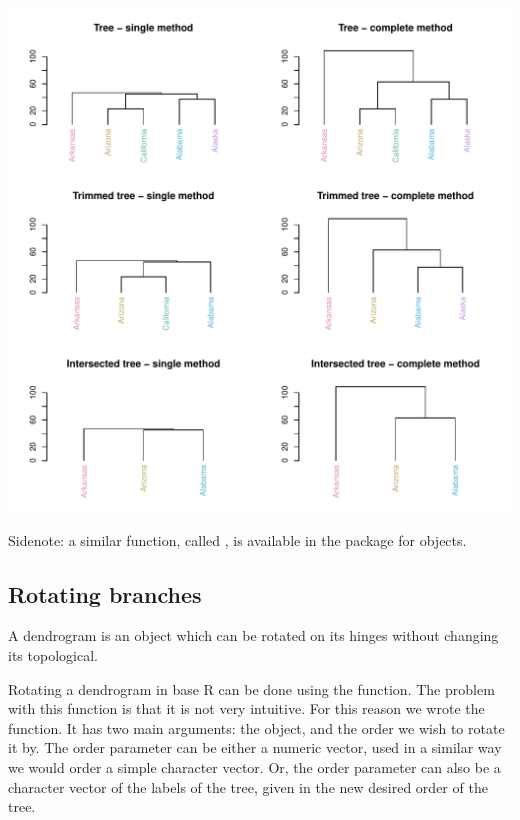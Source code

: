 \documentclass[shortnames,nojss,article]{jss}\usepackage[]{graphicx}\usepackage[]{color}
\makeatletter
\def\maxwidth{ %
  \ifdim\Gin@nat@width>\linewidth
    \linewidth
  \else
    \Gin@nat@width
  \fi
}
\newenvironment{kframe}{%
 \def\at@end@of@kframe{}%
 \ifinner\ifhmode%
  \def\at@end@of@kframe{\end{minipage}}%
  \begin{minipage}{\columnwidth}%
 \fi\fi%
 \def\FrameCommand##1{\hskip\@totalleftmargin \hskip-\fboxsep
 \colorbox{shadecolor}{##1}\hskip-\fboxsep
     \hskip-\linewidth \hskip-\@totalleftmargin \hskip\columnwidth}%
 \MakeFramed {\advance\hsize-\width
   \@totalleftmargin\z@ \linewidth\hsize
   \@setminipage}}%
 {\par\unskip\endMakeFramed%
 \at@end@of@kframe}
\newenvironment{knitrout}{}{} %
\makeatother
\begin{document}
\begin{knitrout}
{\centering \includegraphics[width=\maxwidth]{figure/unnamed-chunk-29} 

}


\begin{kframe}\begin{alltt}


\end{alltt}
\end{kframe}
\end{knitrout}


Sidenote: a similar function, called , is available in the  package for  objects.


\subsection{Rotating branches}

A dendrogram is an object which can be rotated on its hinges without 
changing its topological.

Rotating a dendrogram in base R can be done using the  function.
The problem with this function is that it is not very intuitive. For this reason
we wrote the  function. It has two main arguments: the object, and
the order we wish to rotate it by. The order parameter can be either a numeric
vector, used in a similar way we would order a simple character vector. Or, the
order parameter can also be a character vector of the labels of the tree, given
in the new desired order of the tree.
\end{document}
